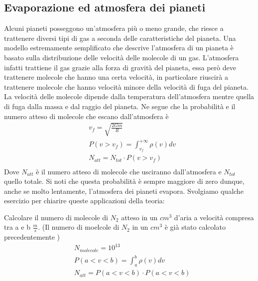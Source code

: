 \documentclass[
10pt, %
a4paper, %
oneside, %
headinclude,footinclude, %
BCOR5mm, %
]{scrartcl}
\begin{document}
\subsection{Evaporazione ed atmosfera dei pianeti}
Alcuni pianeti posseggono un'atmosfera più o meno grande, che riesce a trattenere diversi tipi di gas a seconda delle caratteristiche del pianeta. Una modello estremamente semplificato che descrive l'atmosfera di un pianeta è basato sulla distribuzione delle velocità delle molecole di un gas. L'atmosfera infatti trattiene il gas grazie alla forza di gravità del pianeta, essa però deve trattenere molecole che hanno una certa velocità, in particolare riuscirà a trattenere molecole che hanno velocità minore della velocità di fuga del pianeta. La velocità delle molecole dipende dalla temperatura dell'atmosfera mentre quella di fuga dalla massa e dal raggio del pianeta. Ne segue che la probabilità e il numero atteso di molecole che escano dall'atmosfera è
\begin{align*} 
	&v_f = \sqrt{\frac{2 G m}{R}}\\
	&P(v > v_f) = \int_{v_f}^{+\infty}\rho(v)dv\\
	&N_{att} = N_{tot} \cdot P(v > v_f)\\
\end{align*} 
Dove $N_{att}$ è il numero atteso di molecole che usciranno dall'atmosfera e $N_{tot}$ quello totale. Si noti che questa probabilità è sempre maggiore di zero dunque, anche se molto lentamente, l'atmosfera dei pianeti evapora. Svolgiamo qualche esercizio per chiarire queste applicazioni della teoria:
\begin{exercise}
	Calcolare il numero di molecole di $N_2$ atteso in un $cm^3$ d'aria a velocità compresa tra a e b $\frac{m}{s}$. (Il numero di moelcole di $N_2$ in un $cm^3$ è già stato calcolato precedentemente )
	\begin{align*} 
		&N_{molecole} = 10^{13}\\
		&P(a<v<b) = \int_{a}^{b}\rho(v)dv\\
		&N_{att}=P(a<v<b)\cdot P(a<v<b) 
	\end{align*} 
\end{exercise}
\end{document}
